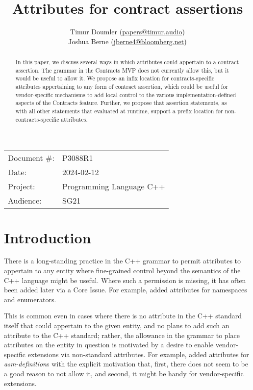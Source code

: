 

 \usepackage[bottom]{footmisc} 


\title{Attributes for contract assertions}
\author{ Timur Doumler \small(\href{mailto:papers@timur.audio}{papers@timur.audio})  \\
Joshua Berne \small(\href{mailto:jberne4@bloomberg.net}{jberne4@bloomberg.net})
}
\date{}
\maketitle

\begin{tabular}{ll}
Document \#: & P3088R1 \\
Date: &2024-02-12 \\
Project: & Programming Language C++ \\
Audience: & SG21
\end{tabular}

\begin{abstract}
In this paper, we discuss several ways in which attributes could appertain to a contract assertion. The grammar in the Contracts MVP does not currently allow this, but it would be useful to allow it. We propose an infix location for contracts-specific attributes appertaining to any form of contract assertion, which could be useful for vendor-specific mechanisms to add local control to the various implementation-defined aspects of the Contracts feature.  Further, we propose that assertion statements, as with all other statements that evaluated at runtime, support a prefix location for non-contracts-specific attributes.
\end{abstract}

\section{Introduction}
\label{sec:intro}

There is a long-standing practice in the C++ grammar to permit attributes to appertain to any entity where fine-grained control beyond the semantics of the C++ language might be useful. Where such a permission is missing, it has often been  added later via a Core Issue. For example, \cite{CWG1657} added attributes for namespaces and enumerators.

This is common even in cases where there is no attribute in the C++ standard itself that could appertain to the given entity, and no plans to add such an attribute to the C++ standard; rather, the allowance in the grammar to place attributes on the entity in question is motivated by a desire to enable vendor-specific extensions via non-standard attributes. For example, \cite{CWG2262} added attributes for \emph{asm-definition}s with the explicit motivation that, first, there does not seem to be a good reason to not allow it, and second, it might be handy for vendor-specific extensions.

